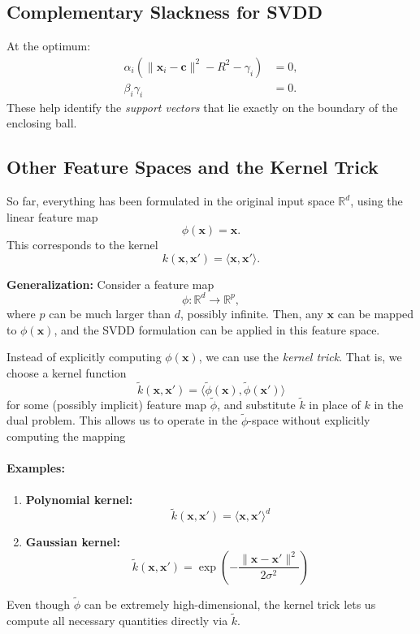 \documentclass[11pt]{report}
\begin{document}
\subsection{Complementary Slackness for SVDD}
At the optimum:
\begin{align}
\alpha_i \left( \|\mathbf{x}_i - \mathbf{c} \|^2 - R^2 - \gamma_i \right) &= 0, \\
\beta_i \gamma_i &= 0.
\end{align}
These help identify the \emph{support vectors} that lie exactly on the boundary of the enclosing ball.

\subsection{Other Feature Spaces and the Kernel Trick}

So far, everything has been formulated in the original input space 
$\mathbb{R}^d$, using the linear feature map
\[
\phi(\mathbf{x}) = \mathbf{x}.
\]
This corresponds to the kernel
\[
k(\mathbf{x}, \mathbf{x}') = \langle \mathbf{x}, \mathbf{x}' \rangle.
\]

\noindent
\textbf{Generalization:}  
Consider a feature map
\[
\phi: \mathbb{R}^d \to \mathbb{R}^p,
\]
where $p$ can be much larger than $d$, possibly infinite. Then, any 
$\mathbf{x}$ can be mapped to $\phi(\mathbf{x})$, and the SVDD formulation 
can be applied in this feature space.

Instead of explicitly computing $\phi(\mathbf{x})$, we can use the 
\emph{kernel trick}. That is, we choose a kernel function
\[
\tilde{k}(\mathbf{x}, \mathbf{x}') = \langle \tilde{\phi}(\mathbf{x}), \tilde{\phi}(\mathbf{x}') \rangle
\]
for some (possibly implicit) feature map $\tilde{\phi}$, and substitute 
$\tilde{k}$ in place of $k$ in the dual problem. This allows us to operate 
in the $\tilde{\phi}$-space without explicitly computing the mapping \cite{ScholkopfSmola2002}

\paragraph{Examples:}
\begin{enumerate}
    \item \textbf{Polynomial kernel:}
    \[
    \tilde{k}(\mathbf{x}, \mathbf{x}') = \langle \mathbf{x}, \mathbf{x}' \rangle^d
    \]
    \item \textbf{Gaussian kernel:}
    \[
    \tilde{k}(\mathbf{x}, \mathbf{x}') = \exp\left( -\frac{\|\mathbf{x} - \mathbf{x}'\|^2}{2\sigma^2} \right)
    \]
\end{enumerate}

Even though $\tilde{\phi}$ can be extremely high-dimensional, the kernel 
trick lets us compute all necessary quantities directly via $\tilde{k}$.



\nocite{*}
\end{document}
